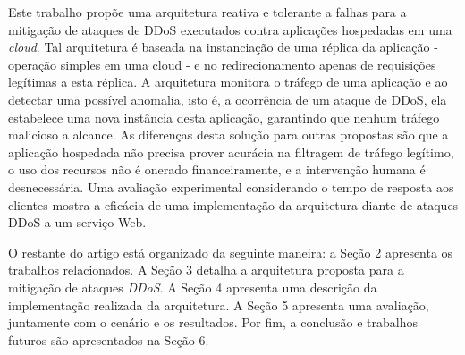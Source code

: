 Este trabalho propõe uma arquitetura reativa e tolerante a falhas para a mitigação de ataques de DDoS executados contra aplicações hospedadas em uma \emph{cloud}. Tal arquitetura é baseada na instanciação de uma réplica da aplicação - operação simples em uma cloud - e no redirecionamento apenas de requisições legítimas a esta réplica.  A arquitetura monitora o tráfego de uma aplicação e ao detectar uma possível anomalia, isto é, a ocorrência de um ataque de DDoS, ela estabelece uma nova instância desta aplicação, garantindo que nenhum tráfego malicioso a alcance. 
As diferenças desta solução para outras propostas são que a aplicação hospedada não precisa prover acurácia na filtragem de tráfego legítimo, o uso dos recursos não é onerado financeiramente, e a intervenção humana é desnecessária. 
Uma avaliação experimental considerando o tempo de resposta aos clientes %
mostra a eficácia de uma implementação da arquitetura diante de ataques DDoS a um serviço Web.
 

O restante do artigo está organizado da seguinte maneira: a Seção 2 apresenta os trabalhos relacionados. A Seção 3 detalha a arquitetura proposta para a mitigação de ataques \emph{DDoS}. A Seção 4 apresenta uma descrição da implementação realizada da arquitetura. A Seção 5 apresenta uma avaliação, juntamente com o cenário e os resultados. Por fim, a conclusão e trabalhos futuros são apresentados na Seção 6.
